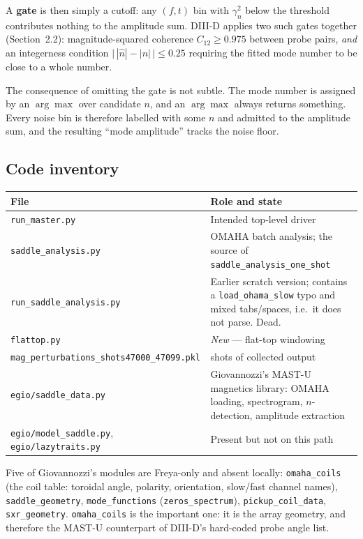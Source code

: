 \documentclass[11pt,a4paper]{article}
\newcommand{\code}[1]{\texttt{\small #1}}
\newcommand{\bk}{\discretionary{}{}{}}   %
\begin{document}
A \textbf{gate} is then simply a cutoff: any $(f,t)$ bin with $\gamma_n^2$ below the
threshold contributes nothing to the amplitude sum. DIII-D applies two such gates
together (Section~2.2): magnitude-squared coherence $C_{12} \ge 0.975$ between probe
pairs, \emph{and} an integerness condition $\big|\,|\hat n| - |n|\,\big| \le 0.25$
requiring the fitted mode number to be close to a whole number.

The consequence of omitting the gate is not subtle. The mode number is assigned by an
$\arg\max$ over candidate $n$, and an $\arg\max$ always returns something. Every noise bin
is therefore labelled with some $n$ and admitted to the amplitude sum, and the resulting
``mode amplitude'' tracks the noise floor.

\subsection{Code inventory}

\begin{longtable}{@{}>{\raggedright\arraybackslash}p{}>{\raggedright\arraybackslash}p{}@{}}
\toprule
\textbf{File} & \textbf{Role and state} \\
\midrule
\endhead
\code{run\_master.py} & Intended top-level driver \\
\code{saddle\_analysis.py} & OMAHA batch analysis; the source of \code{saddle\_analysis\_one\_shot} \\
\code{run\_saddle\_analysis.py} & Earlier scratch version; contains a \code{load\_ohama\_slow} typo and mixed tabs/spaces, i.e.\ it does not parse. Dead. \\
\code{flattop.py} & \emph{New} --- flat-top windowing \\
\code{mag\_\bk perturbations\_\bk shots47000\_\bk 47099.pkl} & 78 shots of collected output \\
\midrule
\code{egio/saddle\_data.py} & Giovannozzi's MAST-U magnetics library: OMAHA loading, spectrogram, $n$-detection, amplitude extraction \\
\code{egio/model\_saddle.py}, \code{egio/lazytraits.py} & Present but not on this path \\
\bottomrule
\end{longtable}

\noindent
Five of Giovannozzi's modules are Freya-only and absent locally: \code{omaha\_coils}
(the coil table: toroidal angle, polarity, orientation, slow/fast channel names),
\code{saddle\_geometry}, \code{mode\_functions} (\code{zeros\_spectrum}),
\code{pickup\_coil\_data}, \code{sxr\_geometry}. \code{omaha\_coils} is the important one:
it is the array geometry, and therefore the MAST-U counterpart of DIII-D's hard-coded
probe angle list.
\end{document}

